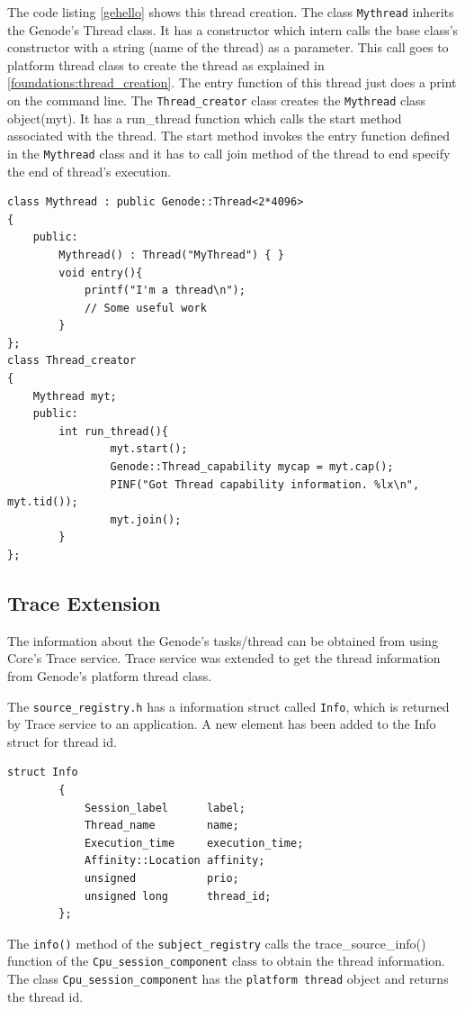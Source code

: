 The code listing \ref{gehello} shows this thread creation. The class \texttt{Mythread} inherits the Genode's Thread class. It has a constructor which intern calls the base class's constructor with a string (name of the thread) as a parameter. This call goes to platform thread class to create the thread as explained in \ref{foundations:thread_creation}. The entry function of this thread just does a print on the  command line. The \texttt{Thread\_creator} class creates the \texttt{Mythread} class object(myt). It has a run\_thread function which calls the start method associated with the thread. The start method invokes the entry function defined in the \texttt{Mythread} class and it has to call join method of the thread to end specify the end of thread's execution.

\begin{lstlisting}[caption={gehello trace utility},label={gehello}, style=customcpp]
class Mythread : public Genode::Thread<2*4096>
{
	public:
		Mythread() : Thread("MyThread") { }
		void entry(){
			printf("I'm a thread\n");
			// Some useful work
		}
};
class Thread_creator
{
	Mythread myt;
	public:
		int run_thread(){
				myt.start();
				Genode::Thread_capability mycap = myt.cap();
				PINF("Got Thread capability information. %lx\n", myt.tid());
				myt.join();
		}
};
\end{lstlisting}

\subsection{Trace Extension}
The information about the Genode's tasks/thread can be obtained from using Core's Trace service. Trace service was extended to get the thread information from Genode's platform thread class. 

The \texttt{source\_registry.h} has a information struct called \texttt{Info}, which is returned by Trace service to an application. A new element has been added to the Info struct for thread id. 


\begin{lstlisting}[style=customcpp]
	struct Info
		{
			Session_label      label;
			Thread_name        name;
			Execution_time     execution_time;
			Affinity::Location affinity;
			unsigned 		   prio;
			unsigned long	   thread_id;
		};
\end{lstlisting}


The \texttt{info()} method of the \texttt{subject\_registry} calls the {trace\_source\_info()} function of the \texttt{Cpu\_session\_component} class to obtain the thread information. The class \texttt{Cpu\_session\_component} has the \texttt{platform thread} object and returns the thread id.

